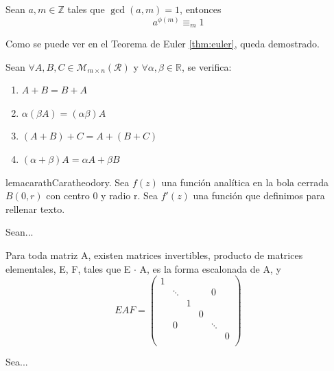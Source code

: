 \begin{teorema}[Euler] \label{thm:euler}
	Sean $a,m\in \mathbb{Z}$ tales que $\gcd(a, m)=1$, entonces \[a^{\phi(m)}\equiv_m1\]
\end{teorema}

Como se puede ver en el Teorema de Euler \ref{thm:euler}, queda demostrado.

\begin{teorema}
	Sean $\forall A, B, C\in \mathcal{M}_{m\times n}(\mathcal{R})$ y $\forall \alpha, \beta\in \mathbb{R}$, se verifica:
	\begin{multicols}{2}
		\begin{enumerate} 
			\item $A+B=B+A$
			\item $\alpha(\beta A)=(\alpha \beta)A$
			\item $(A+B)+C=A+(B+C)$
			\item $(\alpha+\beta)A=\alpha A + \beta B$
		\end{enumerate}
	\end{multicols}
\end{teorema}

\begin{restatable}{lema}{carath}Caratheodory.\label{lema:carath}
	Sea $f(z)$ una función analítica en la bola cerrada $B(0,r)$ con centro 0 y radio r. Sea $f'(z)$ una función que definimos para rellenar texto.
\end{restatable}

\begin{prop}
	Sean...
\end{prop}

\begin{corol}
	Para toda matriz A, existen matrices invertibles, producto de matrices elementales, E, F, tales que E $\cdot$ A, es la forma escalonada de A, y 
	\[
	EAF=\begin{pmatrix}
		1&\\
		& \ddots& & &  0 \\
		& & 1 & \\
		& & & 0 & \\
		& 0 & & & \ddots\\
		& & & & &0\\
	\end{pmatrix}
	\]
\end{corol}

\begin{lema}
	Sea...
\end{lema}

